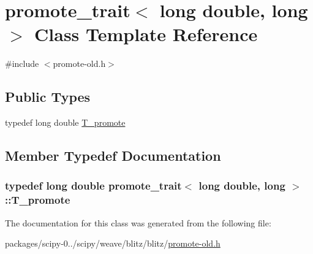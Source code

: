 \hypertarget{classpromote__trait_3_01long_01double_00_01long_01_4}{}\section{promote\+\_\+trait$<$ long double, long $>$ Class Template Reference}
\label{classpromote__trait_3_01long_01double_00_01long_01_4}


{\ttfamily \#include $<$promote-\/old.\+h$>$}

\subsection*{Public Types}
\begin{DoxyCompactItemize}
\item 
typedef long double \hyperlink{classpromote__trait_3_01long_01double_00_01long_01_4_a107958e7ad09eb6453bc71e70b81ed21}{T\+\_\+promote}
\end{DoxyCompactItemize}


\subsection{Member Typedef Documentation}
\hypertarget{classpromote__trait_3_01long_01double_00_01long_01_4_a107958e7ad09eb6453bc71e70b81ed21}{}
\subsubsection[{T\+\_\+promote}]{\setlength{\rightskip}{0pt plus 5cm}typedef long double {\bf promote\+\_\+trait}$<$ long double, long $>$\+::{\bf T\+\_\+promote}}\label{classpromote__trait_3_01long_01double_00_01long_01_4_a107958e7ad09eb6453bc71e70b81ed21}


The documentation for this class was generated from the following file\+:\begin{DoxyCompactItemize}
\item 
packages/scipy-\/0../scipy/weave/blitz/blitz/\hyperlink{promote-old_8h}{promote-\/old.\+h}\end{DoxyCompactItemize}
